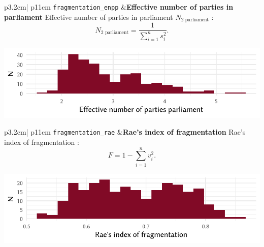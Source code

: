 \documentclass[
]{scrartcl}
\begin{document}
\begin{longtable}{p{3.2cm}| p{11cm}}
\texttt{fragmentation\_enpp} &\textbf{Effective number of parties in parliament}\newline 
Effective number of parties in parliament $N_{2 \text{ parliament}}$ \parencite{laaksoEffectiveNumberParties1979}:
           \begin{equation}N_{2 \text{ parliament}} = \frac{1}{\sum_{i = 1}^{n}s_{i}^{2}}. \end{equation}



\hspace*{.25cm}
\begin{minipage}[t]{\linewidth }
\vspace{0pt}
\includegraphics[width = \linewidth]{cbfiles/enppplot.pdf}
\end{minipage}



\end{longtable}

\begin{longtable}{p{3.2cm}| p{11cm}}
\texttt{fragmentation\_rae} &\textbf{Rae's index of fragmentation}\newline 
Rae's index of fragmentation \parencite{raeNoteFractionalizationEuropean1968}:
           \begin{equation}F = 1 - \sum_{i = 1}^{n}v_{i}^{2}.\end{equation}



\hspace*{.25cm}
\begin{minipage}[t]{\linewidth }
\vspace{0pt}
\includegraphics[width = \linewidth]{cbfiles/fragrae.pdf}
\end{minipage}



\end{longtable}
\end{document}
